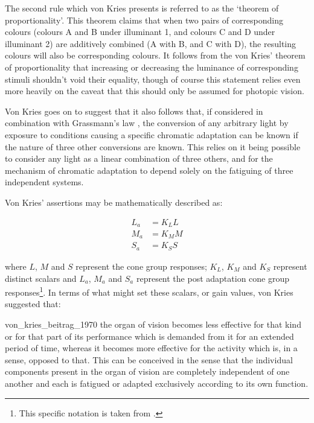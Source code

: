 The second rule which von Kries presents is referred to as the `theorem of proportionality'. This theorem claims that when two pairs of corresponding colours (colours A and B under illuminant 1, and colours C and D under illuminant 2) are additively combined (A with B, and C with D), the resulting colours will also be corresponding colours. It follows from the von Kries' theorem of proportionality that increasing or decreasing the luminance of corresponding stimuli shouldn't void their equality, though of course this statement relies even more heavily on the caveat that this should only be assumed for photopic vision.

Von Kries goes on to suggest that it also follows that, if considered in combination with Grassmann's law \citep{grassmann_zur_1853}, the conversion of any arbitrary light by exposure to conditions causing a specific chromatic adaptation can be known if the nature of three other conversions are known. This relies on it being possible to consider any light as a linear combination of three others, and for the mechanism of chromatic adaptation to depend solely on the fatiguing of three independent systems.

Von Kries' assertions may be mathematically described as:

\begin{subequations}
\begin{align}
L_{a}&=K_{L}L \\
M_{a}&=K_{M}M \\
S_{a}&=K_{S}S
\end{align}
\end{subequations}

where $L$, $M$ and $S$ represent the cone group responses; $K_{L}$, $K_{M}$ and $K_{S}$ represent distinct scalars and $L_{a}$, $M_{a}$ and $S_{a}$ represent the post adaptation cone group responses\footnote{This specific notation is taken from \citet[p. 183]{fairchild_color_2013}.}. In terms of what might set these scalars, or gain values, von Kries suggested that: 

\begin{itquote}{von_kries_beitrag_1970}
the organ of vision becomes less effective for that kind or for that part of its performance which is demanded from it for an extended period of time, whereas it becomes more effective for the activity which is, in a sense, opposed to that. This can be conceived in the sense that the individual components present in the organ of vision are completely independent of one another and each is fatigued or adapted exclusively according to its own function.
\end{itquote}

